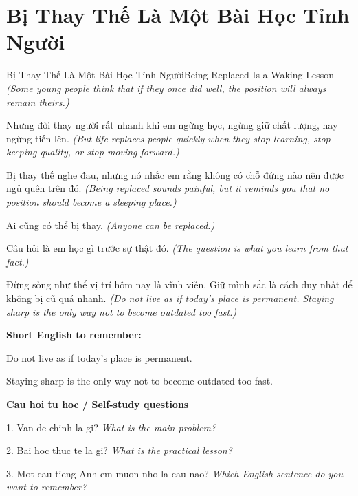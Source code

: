 \section{Bị Thay Thế Là Một Bài Học Tỉnh Người}
\begin{truyen}{Bị Thay Thế Là Một Bài Học Tỉnh Người}{Being Replaced Is a Waking Lesson}
\textit{(Some young people think that if they once did well, the position will always remain theirs.)}

Nhưng đời thay người rất nhanh khi em ngừng học, ngừng giữ chất lượng, hay ngừng tiến lên.
\textit{(But life replaces people quickly when they stop learning, stop keeping quality, or stop moving forward.)}

Bị thay thế nghe đau, nhưng nó nhắc em rằng không có chỗ đứng nào nên được ngủ quên trên đó.
\textit{(Being replaced sounds painful, but it reminds you that no position should become a sleeping place.)}

Ai cũng có thể bị thay.
\textit{(Anyone can be replaced.)}

Câu hỏi là em học gì trước sự thật đó.
\textit{(The question is what you learn from that fact.)}

\end{truyen}

\begin{baihoc}
Đừng sống như thể vị trí hôm nay là vĩnh viễn. Giữ mình sắc là cách duy nhất để không bị cũ quá nhanh.
\textit{(Do not live as if today’s place is permanent. Staying sharp is the only way not to become outdated too fast.)}
\end{baihoc}

\begin{ghinhoanh}
\textbf{Short English to remember:}

Do not live as if today’s place is permanent.

Staying sharp is the only way not to become outdated too fast.

\end{ghinhoanh}

\begin{tuhocnhanh}
\textbf{Cau hoi tu hoc / Self-study questions}

1. Van de chinh la gi? \textit{What is the main problem?}

2. Bai hoc thuc te la gi? \textit{What is the practical lesson?}

3. Mot cau tieng Anh em muon nho la cau nao? \textit{Which English sentence do you want to remember?}
\end{tuhocnhanh}
\ngancach

